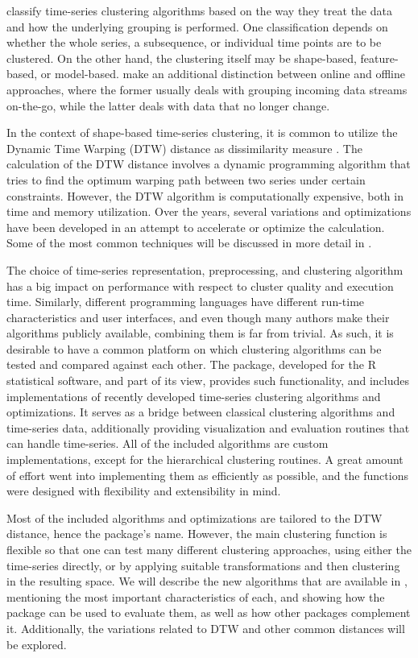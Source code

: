 \citet{aghabozorgi2015} classify time-series clustering algorithms based on the way they treat the data and how the underlying grouping is performed.
One classification depends on whether the whole series,
a subsequence,
or individual time points are to be clustered.
On the other hand,
the clustering itself may be shape-based,
feature-based,
or model-based.
\citet{aggarwal2013} make an additional distinction between online and offline approaches,
where the former usually deals with grouping incoming data streams on-the-go,
while the latter deals with data that no longer change.

In the context of shape-based time-series clustering,
it is common to utilize the Dynamic Time Warping (DTW) distance as dissimilarity measure \citep{aghabozorgi2015}.
The calculation of the DTW distance involves a dynamic programming algorithm that tries to find the optimum warping path between two series under certain constraints.
However, the DTW algorithm is computationally expensive,
both in time and memory utilization.
Over the years, several variations and optimizations have been developed in an attempt to accelerate or optimize the calculation.
Some of the most common techniques will be discussed in more detail in .

The choice of time-series representation,
preprocessing,
and clustering algorithm has a big impact on performance with respect to cluster quality and execution time.
Similarly, different programming languages have different run-time characteristics and user interfaces,
and even though many authors make their algorithms publicly available,
combining them is far from trivial.
As such,
it is desirable to have a common platform on which clustering algorithms can be tested and compared against each other.
The \dtwclust{} package,
developed for the R statistical software,
and part of its  view,
provides such functionality,
and includes implementations of recently developed time-series clustering algorithms and optimizations.
It serves as a bridge between classical clustering algorithms and time-series data,
additionally providing visualization and evaluation routines that can handle time-series.
All of the included algorithms are custom implementations,
except for the hierarchical clustering routines.
A great amount of effort went into implementing them as efficiently as possible,
and the functions were designed with flexibility and extensibility in mind.

Most of the included algorithms and optimizations are tailored to the DTW distance, hence the package's name.
However, the main clustering function is flexible so that one can test many different clustering approaches,
using either the time-series directly,
or by applying suitable transformations and then clustering in the resulting space.
We will describe the new algorithms that are available in \dtwclust{},
mentioning the most important characteristics of each,
and showing how the package can be used to evaluate them,
as well as how other packages complement it.
Additionally, the variations related to DTW and other common distances will be explored.

